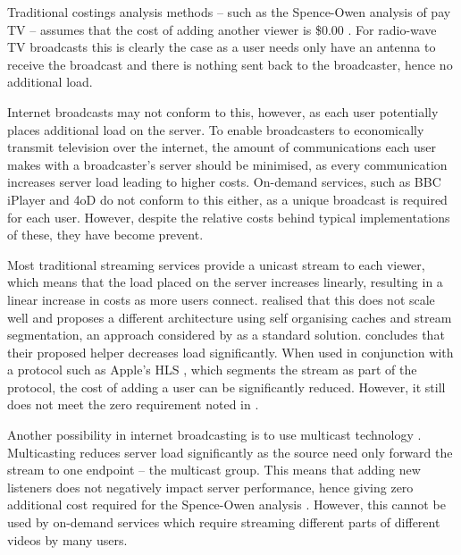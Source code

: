 	Traditional costings analysis methods -- such as the Spence-Owen analysis of pay TV -- assumes that the cost of adding another viewer is \$0.00 \citet{broadcastEconomics}. For radio-wave TV broadcasts this is clearly the case as a user needs only have an antenna to receive the broadcast and there is nothing sent back to the broadcaster, hence no additional load. 

	Internet broadcasts may not conform to this, however, as each user potentially places additional load on the server. To enable broadcasters to economically transmit television over the internet, the amount of communications each user makes with a broadcaster's server should be minimised, as every communication increases server load leading to higher costs. On-demand services, such as BBC iPlayer and 4oD do not conform to this either, as a unique broadcast is required for each user. However, despite the relative costs behind typical implementations of these, they have become prevent.

	Most traditional streaming services provide a unicast stream to each viewer, which means that the load placed on the server increases linearly, resulting in a linear increase in costs as more users connect. \citet{cachedStream} realised that this does not scale well and proposes a different architecture using self organising caches and stream segmentation, an approach considered by \citet{segmentProxyCaching} as a standard solution. \citet{cachedStream} concludes that their proposed helper decreases load significantly. When used in conjunction with a protocol such as Apple's HLS \cite{HLS}, which segments the stream as part of the protocol, the cost of adding a user can be significantly reduced. However, it still does not meet the zero requirement noted in \citet{broadcastEconomics}.

	Another possibility in internet broadcasting is to use multicast technology \citep{multicast}. Multicasting reduces server load significantly as the source need only forward the stream to one endpoint -- the multicast group. This means that adding new listeners does not negatively impact server performance, hence giving zero additional cost required for the Spence-Owen analysis \citep{broadcastEconomics}. However, this cannot be used by on-demand services which require streaming different parts of different videos by many users.
